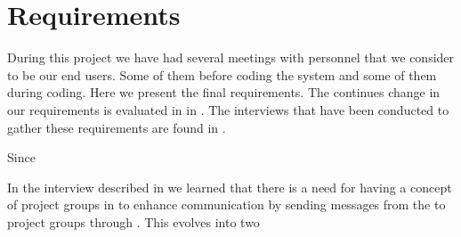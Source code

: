 \section{Requirements}
\label{sec:requirements}
During this project we have had several meetings with personnel that we consider to be our end users.
Some of them before coding the system and some of them during coding.
Here we present the final requirements.
The continues change in our requirements is evaluated in  in .
The interviews that have been conducted to gather these requirements are found in .

Since 

In the interview described in  we learned that there is a need for having a concept of project groups in \moodle{} to enhance communication by sending messages from the \admpers{} to project groups through \moodle{}.
This evolves into two 
